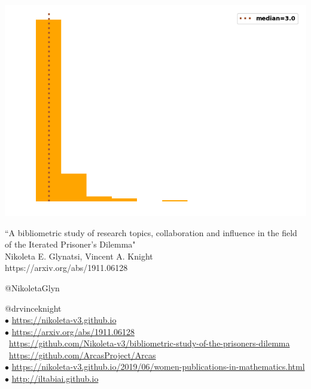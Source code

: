 \documentclass{beamer}
\begin{document}
\begin{frame}
    \begin{center}
    \includegraphics[width=.7\textwidth]{static/degree_dist.png}
    \end{center}
\end{frame}

\begin{frame}
    \begin{center}
        \large{``A bibliometric study of research topics, collaboration and influence in the field of the Iterated Prisoner's Dilemma"} \\ \vspace{.5cm}
        \small{Nikoleta E. Glynatsi, Vincent A. Knight} \\ \vspace{.5cm}
        \small{https://arxiv.org/abs/1911.06128}
    \end{center}
\end{frame}

\begin{frame}
    \begin{center}
    \faTwitter @NikoletaGlyn \\
    
    \vspace{1cm}
    \end{center}

    \footnotesize
    \faTwitter @drvinceknight \\
    $\bullet$ \url{https://nikoleta-v3.github.io} \\
    $\bullet$ \url{https://arxiv.org/abs/1911.06128} \\
    \faGithub  \ \url{https://github.com/Nikoleta-v3/bibliometric-study-of-the-prisoners-dilemma} \\
    \faGithub  \ \url{https://github.com/ArcasProject/Arcas} \\
    $\bullet$ \url{https://nikoleta-v3.github.io/2019/06/women-publications-in-mathematics.html} \\
    $\bullet$ \url{http://iltabiai.github.io} \\
\end{frame}
\end{document}
